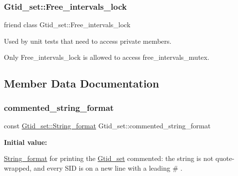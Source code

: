 \subsubsection{\texorpdfstring{Gtid\+\_\+set\+::\+Free\+\_\+intervals\+\_\+lock}{Gtid\_set::Free\_intervals\_lock}}
{\footnotesize\ttfamily friend class Gtid\+\_\+set\+::\+Free\+\_\+intervals\+\_\+lock\hspace{0.3cm}{\ttfamily [friend]}}



Used by unit tests that need to access private members. 

Only Free\+\_\+intervals\+\_\+lock is allowed to access free\+\_\+intervals\+\_\+mutex. 

\subsection{Member Data Documentation}
\mbox{\label{classGtid__set_a4ba668b76ba3d4a4d96a91389dc31817}} 
\subsubsection{\texorpdfstring{commented\+\_\+string\+\_\+format}{commented\_string\_format}}
{\footnotesize\ttfamily const \mbox{\hyperlink{structGtid__set_1_1String__format}{Gtid\+\_\+set\+::\+String\+\_\+format}} Gtid\+\_\+set\+::commented\+\_\+string\+\_\+format\hspace{0.3cm}{\ttfamily [static]}}

{\bfseries Initial value\+:}
\begin{DoxyCode}{0}
\DoxyCodeLine{=}
\DoxyCodeLine{\{}
\DoxyCodeLine{  \textcolor{stringliteral}{"\# "}, \textcolor{stringliteral}{""}, \textcolor{stringliteral}{":"}, \textcolor{stringliteral}{"-"}, \textcolor{stringliteral}{":"}, \textcolor{stringliteral}{",\(\backslash\)n\# "}, \textcolor{stringliteral}{"\# [empty]"},}
\DoxyCodeLine{\}}
\end{DoxyCode}
\mbox{\hyperlink{structGtid__set_1_1String__format}{String\+\_\+format}} for printing the \mbox{\hyperlink{classGtid__set}{Gtid\+\_\+set}} commented\+: the string is not quote-\/wrapped, and every S\+ID is on a new line with a leading \textquotesingle{}\# \textquotesingle{}. \mbox{\label{classGtid__set_a65b9f6c31cfc7d5ca7b1564411c2a416}} 
